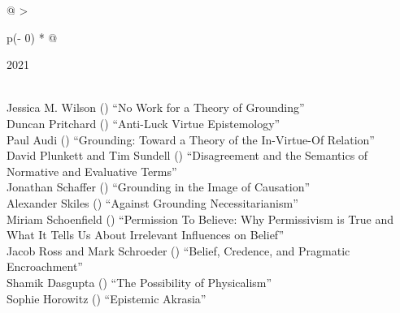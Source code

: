 \documentclass[
  10pt,
  letterpaper,
  DIV=11,
  numbers=noendperiod,
  twoside]{scrartcl}
\begin{document}
\begin{longtable}[]{@{}
  >{\raggedright\arraybackslash}p{(\columnwidth - 0\tabcolsep) * }@{}}

\caption{\label{tbl-top-ten-2012}Most cited articles published less than
ten years ago as of 2021.}

\tabularnewline

\toprule\noalign{}
\begin{minipage}[b]{\linewidth}\raggedright
2021
\end{minipage} \\
\midrule\noalign{}
\endhead
\bottomrule\noalign{}
\endlastfoot
Jessica M. Wilson
()
``No Work for a Theory of Grounding'' \\
Duncan Pritchard
()
``Anti-Luck Virtue Epistemology'' \\
Paul Audi
()
``Grounding: Toward a Theory of the In-Virtue-Of Relation'' \\
David Plunkett and Tim Sundell
()
``Disagreement and the Semantics of Normative and Evaluative Terms'' \\
Jonathan Schaffer
()
``Grounding in the Image of Causation'' \\
Alexander Skiles
()
``Against Grounding Necessitarianism'' \\
Miriam Schoenfield
()
``Permission To Believe: Why Permissivism is True and What It Tells Us
About Irrelevant Influences on Belief'' \\
Jacob Ross and Mark Schroeder
()
``Belief, Credence, and Pragmatic Encroachment'' \\
Shamik Dasgupta
()
``The Possibility of Physicalism'' \\
Sophie Horowitz
()
``Epistemic Akrasia'' \\

\end{longtable}
\end{document}
